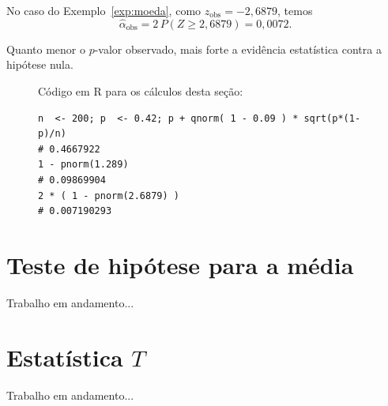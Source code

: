 \documentclass[12pt,a4paper]{article}
\theoremstyle{plain}
\theoremstyle{definition}
\theoremstyle{remark}
\begin{document}
No caso do Exemplo~\ref{exp:moeda}, como $z_{\mathrm{obs}}=-2,6879$, temos
\[
\hat{\alpha}_{\mathrm{obs}}
=
2\, P(Z \geq 2,6879)
=
0,0072
.
\]

Quanto menor o $p$-valor observado, mais forte a evidência estatística contra a hipótese nula.

\begin{figure}[H]
Código em R para os cálculos desta seção:
\footnotesize
\begin{verbatim}
n  <- 200; p  <- 0.42; p + qnorm( 1 - 0.09 ) * sqrt(p*(1-p)/n)
# 0.4667922
1 - pnorm(1.289)
# 0.09869904
2 * ( 1 - pnorm(2.6879) )
# 0.007190293
\end{verbatim}
\end{figure}


\section{Teste de hipótese para a média}

Trabalho em andamento...


\section{Estatística $T$}

Trabalho em andamento...
\end{document}
